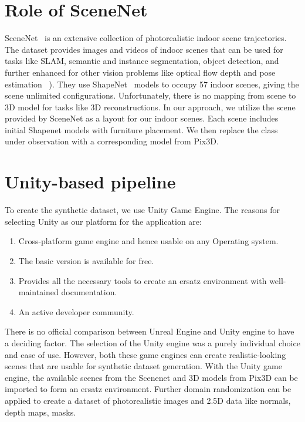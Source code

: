 \section{Role of SceneNet}\label{sec:role-of-scenenet}
SceneNet~\cite{McCormac:etal:ICCV2017} is an extensive collection of photorealistic indoor scene trajectories.
The dataset provides images and videos of indoor scenes that can be used for tasks like SLAM,
semantic and instance segmentation, object detection, and further enhanced for other vision problems like optical flow depth and pose estimation ~\cite{McCormac:etal:ICCV2017}).
They use ShapeNet~\cite{chang2015shapenet} models to occupy 57 indoor scenes, giving the scene unlimited configurations.
Unfortunately, there is no mapping from scene to 3D model for tasks like 3D reconstructions.
In our approach, we utilize the scene provided by SceneNet as a layout for our indoor scenes.
Each scene includes initial Shapenet models with furniture placement.
We then replace the class under observation with a corresponding model from Pix3D.

\section{Unity-based pipeline}\label{sec:unity-based-pipeline}
To create the synthetic dataset, we use Unity Game Engine.
The reasons for selecting Unity as our platform for the application are:
\begin{enumerate}
    \item Cross-platform game engine and hence usable on any Operating system.
    \item The basic version is available for free.
    \item Provides all the necessary tools to create an ersatz environment with well-maintained documentation.
    \item An active developer community.
\end{enumerate}

There is no official comparison between Unreal Engine and Unity engine to have a deciding factor.
The selection of the Unity engine was a purely individual choice and ease of use.
However, both these game engines can create realistic-looking scenes that are usable for synthetic dataset generation.
With the Unity game engine, the available scenes from the Scenenet and 3D models from Pix3D can be imported to form an ersatz environment.
Further domain randomization can be applied to create a dataset of photorealistic images and 2.5D data like normals, depth maps, masks.


